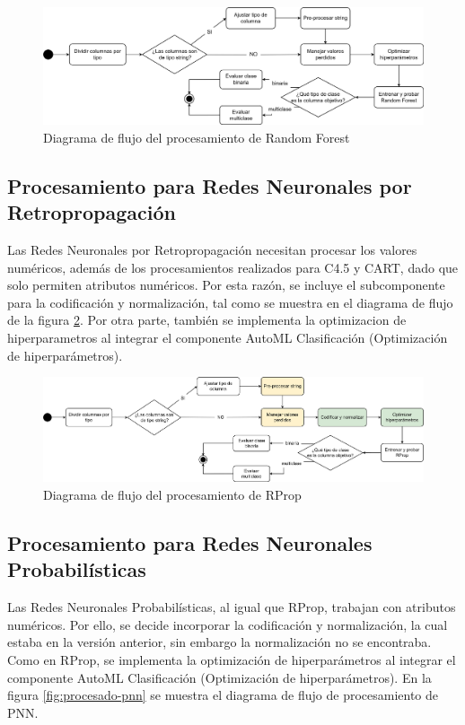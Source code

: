 \begin{figure}[H]
	\centering
	\includegraphics[width=1\linewidth]{"figuras/capi 2/modelos/procesado rf.drawio"}
	\caption{Diagrama de flujo del procesamiento de Random Forest}
	\label{fig:procesado-rf}
\end{figure}


\subsection{Procesamiento para Redes Neuronales por Retropropagación}
Las Redes Neuronales por Retropropagación necesitan procesar los valores numéricos, además de los procesamientos realizados para C4.5 y CART, dado que solo permiten atributos numéricos. Por esta razón, se incluye el subcomponente para la codificación y normalización, tal como se muestra en el diagrama de flujo de la figura \ref{fig:procesado-rprop}. Por otra parte, también se implementa la optimizacion de hiperparametros al integrar el componente AutoML Clasificación (Optimización de hiperparámetros).

 \begin{figure}[H]
	\centering
	\includegraphics[width=1\linewidth]{"figuras/capi 2/modelos/procesado rprop.drawio"}
	\caption{Diagrama de flujo del procesamiento de RProp}
	\label{fig:procesado-rprop}
\end{figure}



\subsection{Procesamiento para Redes Neuronales Probabilísticas}
Las Redes Neuronales Probabilísticas, al igual que RProp, trabajan con atributos numéricos. Por ello, se decide incorporar la codificación y normalización, la cual estaba en la versión anterior, sin embargo la normalización no se encontraba. Como en RProp, se implementa la optimización de hiperparámetros al integrar el componente AutoML Clasificación (Optimización de hiperparámetros). En la figura \ref{fig:procesado-pnn} se muestra el diagrama de flujo de procesamiento de PNN.

